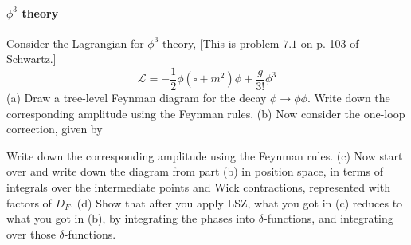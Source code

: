 \documentclass[hyperref, a4paper]{article}
\begin{document}
\paragraph{}

\paragraph{$\phi^3$ theory} Consider the Lagrangian for $\phi^{3}$ theory, [This is problem $7.1$ on p. 103 of Schwartz.]
\[
\mathcal{L}=-\frac{1}{2} \phi\left(\square+m^{2}\right) \phi+\frac{g}{3 !} \phi^{3}
\]
(a) Draw a tree-level Feynman diagram for the decay $\phi \rightarrow \phi \phi$. Write down the corresponding amplitude using the Feynman rules.
(b) Now consider the one-loop correction, given by

Write down the corresponding amplitude using the Feynman rules.
(c) Now start over and write down the diagram from part (b) in position space, in terms of integrals over the intermediate points and Wick contractions, represented with factors of $D_{F}$.
(d) Show that after you apply LSZ, what you got in (c) reduces to what you got in (b), by integrating the phases into $\delta$-functions, and integrating over those $\delta$-functions.
\end{document}
